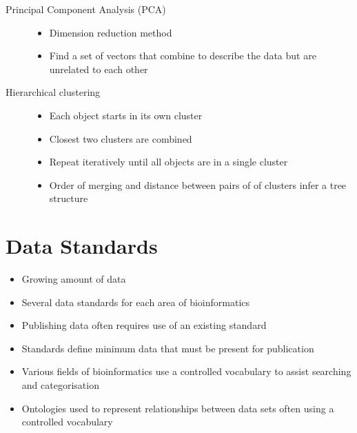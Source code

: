\documentclass[a4paper]{article}
\begin{document}
\begin{description}
  \item[Principal Component Analysis (PCA)] \hfill
    \begin{itemize}
      \item
        Dimension reduction method

      \item
        Find a set of vectors that combine to describe the data but are
        unrelated to each other
    \end{itemize}

  \item[Hierarchical clustering] \hfill
    \begin{itemize}
      \item
        Each object starts in its own cluster

      \item
        Closest two clusters are combined

      \item
        Repeat iteratively until all objects are in a single cluster

      \item
        Order of merging and distance between pairs of of clusters infer a tree
        structure
    \end{itemize}
\end{description}

\section{Data Standards}

\begin{itemize}
  \item
    Growing amount of data

  \item
    Several data standards for each area of bioinformatics

  \item
    Publishing data often requires use of an existing standard

  \item
    Standards define minimum data that must be present for publication

  \item
    Various fields of bioinformatics use a controlled vocabulary to assist
    searching and categorisation

  \item
    Ontologies used to represent relationships between data sets often using a
    controlled vocabulary
\end{itemize}
\end{document}
